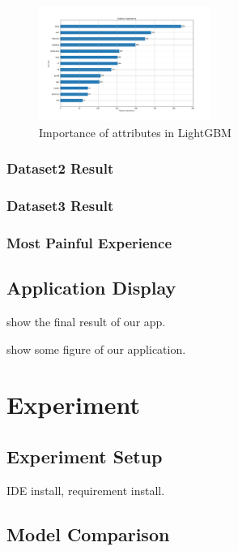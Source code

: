 \documentclass[letterpaper]{article} %
\begin{document}
\begin{figure}[!htbp]
\centering\includegraphics[width=0.5\textwidth]{dataset-1-impor}
\caption{Importance of attributes in LightGBM}
\label{fig:dataset-1-impor}
\end{figure}

\subsubsection{Dataset2 Result}

\subsubsection{Dataset3 Result}

\subsubsection{Most Painful Experience}

\subsection{Application Display}

show the final result of our app.

show some figure of our application.

\section{Experiment}

\subsection{Experiment Setup}

IDE install, requirement install.

\subsection{Model Comparison}
\end{document}
